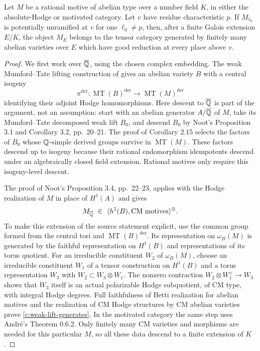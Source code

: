 \begin{lemma}
\label{c:potentially-good-generator}
Let $M$ be a rational motive of abelian type over a number field $K$, in either
the absolute-Hodge or motivated category.  Let $v$ have residue characteristic
$p$.  If $M_{\ell_0}$ is potentially unramified at $v$ for one $\ell_0\ne p$,
then, after a finite Galois extension $E/K$, the object $M_E$ belongs to the
tensor category generated by finitely many abelian varieties over $E$ which
have good reduction at every place above $v$.
\end{lemma}

\begin{proof}
We first work over $\overline{\mathbb Q}$, using the chosen complex embedding.
The weak Mumford--Tate lifting construction of
\citet[Theorem 2.12 and Corollary 2.15, pp.~15--20]{c_noot2006} gives an
abelian variety $B$ with a central isogeny
\[
 \pi^{\mathrm{der}}:\operatorname{MT}(B)^{\mathrm{der}}
       \longrightarrow\operatorname{MT}(M)^{\mathrm{der}}
\]
identifying their adjoint Hodge homomorphisms.  Here descent to
$\overline{\mathbb Q}$ is part of the argument, not an assumption: start with an
abelian generator $A/\overline{\mathbb Q}$ of $M$, take its Mumford--Tate decomposed
weak lift $B_0$, and descend $B_0$ by Noot's Proposition 3.1 and Corollary 3.2,
pp.~20--21.  The proof of Corollary 2.15 selects the factors of $B_0$ whose
$\mathbb Q$-simple derived groups survive in $\operatorname{MT}(M)$.  These factors
descend up to isogeny because their rational endomorphism idempotents descend
under an algebraically closed field extension.  Rational motives only require
this isogeny-level descent.

The proof of Noot's Proposition 3.4, pp.~22--23, applies with the Hodge
realization of $M$ in place of $H^1(A)$ and gives
\begin{equation}
\label{c:weak-lift-generates}
 M_{\overline{\mathbb Q}}\ \in\
 \langle h^1(B),\text{CM motives}\rangle^{\otimes}.
\end{equation}
To make this extension of the source statement explicit, use the common
group formed from the central tori and $\operatorname{MT}(B)^{\mathrm{der}}$.
Its representation on $\omega_B(M)$ is generated by the faithful
representation on $H^1(B)$ and representations of its torus quotient.
For an irreducible constituent $W_2$ of $\omega_B(M)$, choose an irreducible
constituent $W_1$ of a tensor construction on $H^1(B)$ and a torus
representation $W_3$ with $W_2\subset W_3\otimes W_1$.
The nonzero contraction $W_2\otimes W_1^\vee\to W_3$ shows that $W_3$ itself
is an actual polarizable Hodge subquotient, of CM type, with integral
Hodge degrees.  Full faithfulness of Betti realization for abelian motives
and the realization of CM Hodge structures by CM abelian varieties prove
\eqref{c:weak-lift-generates}.  In the motivated category the same step uses
Andr\'e's Theorem 0.6.2.  Only finitely many CM varieties and morphisms are
needed for this particular $M$, so all these data descend to a finite
extension of $K$.


\end{proof}
